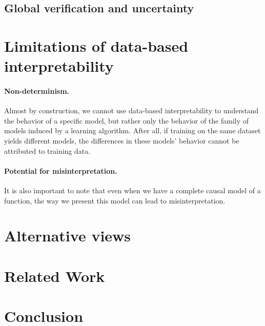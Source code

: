\documentclass{article}
\begin{document}
\subsection{Global verification and uncertainty}

\section{Limitations of data-based interpretability}

\paragraph{Non-determinism.}
Almost by construction, we cannot use data-based interpretability to 
understand the behavior of a specific model, but rather only the behavior 
of the family of models induced by a learning algorithm.
After all, if training on the same dataset yields different models, 
the differences in these models' behavior cannot be attributed to 
training data.

\paragraph{Potential for misinterpretation.} It is also important to
note that even when we have a complete causal model of a function,
the way we present this model can lead to misinterpretation.

\section{Alternative views}

\section{Related Work}

\section{Conclusion}

\printbibliography
\end{document}
